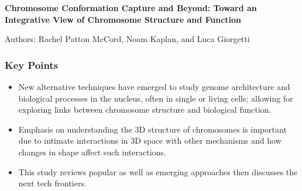 \documentclass[plain,basic]{inVerba-notes}
\begin{document}
\large{\textbf{Chromosome Conformation Capture and Beyond: Toward an Integrative View of Chromosome Structure and Function}}

\small{Authors: Rachel Patton McCord, Noam Kaplan, and Luca Giorgetti\\
\href{https://doi.org/10.1016/j.molcel.2019.12.021}{}}

\vspace{-12pt}
\subsubsection{Key Points}
\begin{itemize}
    \item New alternative techniques have emerged to study genome architecture and biological processes in the nucleus, often in single or living cells; allowing for exploring links between chromosome structure and biological function.
    \item Emphasis on understanding the 3D structure of chromosomes is important due to intimate interactions in 3D space with other mechanisms and how changes in shape affect such interactions.
    \item This study reviews popular as well as emerging approaches then discusses the next tech frontiers.
\end{itemize}

\vspace{-20pt}
\end{document}
